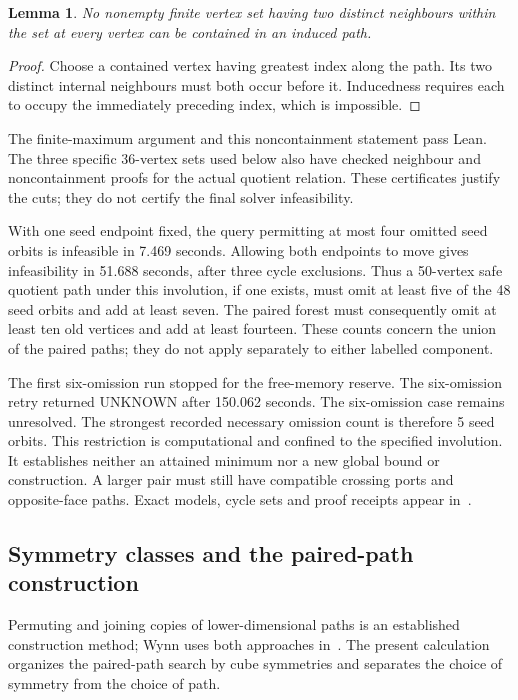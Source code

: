 \documentclass[11pt,a4paper]{article}
\newtheorem{lemma}[theorem]{Lemma}
\theoremstyle{definition}
\theoremstyle{remark}
\begin{document}
\begin{lemma}
No nonempty finite vertex set having two distinct neighbours within
the set at every vertex can be contained in an induced path.
\end{lemma}
\begin{proof}
Choose a contained vertex having greatest index along the path.
Its two distinct internal neighbours must both occur before it.
Inducedness requires each to occupy the immediately preceding index,
which is impossible.
\end{proof}
The finite-maximum argument and this noncontainment statement pass
Lean. The three specific 36-vertex sets used below also have checked
neighbour and noncontainment proofs for the actual quotient relation.
These certificates justify the cuts; they do not certify the final
solver infeasibility.

With one seed endpoint fixed, the query permitting at most four
omitted seed orbits is infeasible in 7.469 seconds. Allowing both
endpoints to move gives infeasibility in 51.688 seconds, after three
cycle exclusions. Thus a 50-vertex safe quotient path under this
involution, if one exists, must omit at least five of the 48 seed
orbits and add at least seven. The paired forest must consequently
omit at least ten old vertices and add at least fourteen. These
counts concern the union of the paired paths; they do not apply
separately to either labelled component.

The first six-omission run stopped for the free-memory reserve.
The six-omission retry returned UNKNOWN after 150.062 seconds. The six-omission case remains unresolved.
The strongest recorded necessary omission count is therefore 5
seed orbits. This restriction is computational and confined to the
specified involution. It establishes neither an attained minimum nor
a new global bound or construction. A larger pair must still have
compatible crossing ports and opposite-face paths. Exact models,
cycle sets and proof receipts appear in~\cite{cycles196archive}.


\subsection{Symmetry classes and the paired-path construction}
\label{sec:symmetry197}

Permuting and joining copies of lower-dimensional paths is an established
construction method; Wynn uses both approaches in~\cite{wynn2012}.
The present calculation organizes the paired-path search by cube symmetries
and separates the choice of symmetry from the choice of path.
\end{document}
